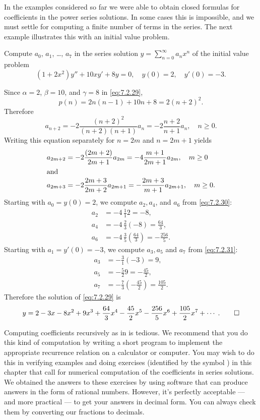 In the examples considered so far we were able to obtain closed
formulas for coefficients in the power series solutions. In some cases
this is impossible, and we must settle for computing a finite number
of terms in the series. The next example illustrates this with an
initial value problem.

\begin{example}\label{example:7.2.4}
Compute  $a_0$, $a_1$, \dots, $a_7$  in the series solution
$y=\sum_{n=0}^\infty a_nx^n$ of the initial value problem
\begin{equation}\label{eq:7.2.29}
(1+2x^2)y''+10xy'+8y=0,\quad y(0)=2,\quad y'(0)=-3.
\end{equation}
\end{example}

\begin{solution}
Since $\alpha=2$, $\beta=10$, and $\gamma=8$ in \eqref{eq:7.2.29},
\[
p(n)=2n(n-1)+10n+8=2(n+2)^2.
\]
 Therefore
\[
a_{n+2}=-2\frac{(n+2)^2}{(n+2)(n+1)}a_n=-2\frac{n+2}{n+1}a_n,\quad n\ge0.
\]
Writing this equation separately for $n=2m$  and $n=2m+1$ yields
\begin{align}
a_{2m+2}&=-2\frac{(2m+2)}{2m+1}a_{2m}=-4\frac{m+1}{2m+1}a_{2m},\quad m\ge
0\label{eq:7.2.30}\\
\shortintertext{and}
a_{2m+3}&=-2\frac{2m+3}{2m+2}a_{2m+1}=-\frac{2m+3}{m+1}a_{2m+1},\quad m\ge0.
\label{eq:7.2.31}
\end{align}
Starting with  $a_0=y(0)=2$, we compute $a_2, a_4$, and $a_6$ from
\eqref{eq:7.2.30}:
\begin{align*}
a_2&=-4\,\frac{1}{1}2=-8,\\
a_4&=-4\,\frac{2}{3}(-8)=\frac{64}{3},\\
a_6&=-4\,\frac{3}{5}\left(\frac{64}{3}\right)=-\frac{256}{5}.
\end{align*}
Starting with $a_1=y'(0)=-3$, we compute $a_3,a_5$ and $a_7$ from
\eqref{eq:7.2.31}:
\begin{align*}
a_3&=-\frac{3}{1}(-3)=9,\\
a_5&=-\frac{5}{2}9=-\frac{45}{2},\\
a_7&=-\frac{7}{3}\left(-\frac{45}{2}\right)=\frac{105}{2}.
\end{align*}
Therefore the solution of \eqref{eq:7.2.29} is
\[
y=2-3x-8x^2+9x^3+\frac{64}{3}x^4-\frac{45}{2}x^5-\frac{256}{5}
x^6+\frac{105}{2}x^7+\cdots\; .\qedhere
\]
\end{solution}

\technology
\medskip

Computing coefficients recursively as in  is
tedious. We recommend that you do this kind of computation by writing
a short program to implement the appropriate recurrence relation on a
calculator or computer. You may wish to do this in
verifying examples and doing exercises (identified by the
symbol
\Cex) in this chapter that call for numerical computation of the
coefficients in series solutions. We obtained the answers to these
exercises by using software that can produce answers in the form of
rational numbers. However, it's perfectly acceptable --- and more
practical --- to get your answers in decimal form. You can always check
them by converting our fractions to decimals.

